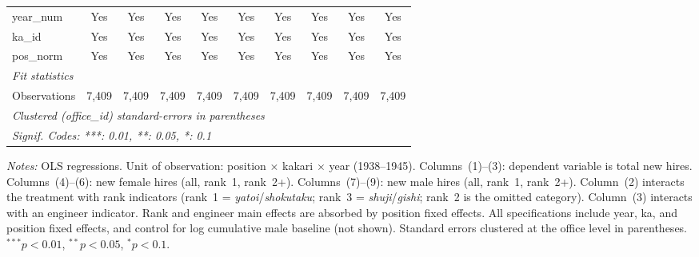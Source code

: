 \begin{table}[htbp]
\begin{threeparttable}
\begin{tabular}{lccccccccc}
   year\_num                      & Yes           & Yes            & Yes            & Yes      & Yes      & Yes           & Yes      & Yes      & Yes\\  
   ka\_id                         & Yes           & Yes            & Yes            & Yes      & Yes      & Yes           & Yes      & Yes      & Yes\\  
   pos\_norm                      & Yes           & Yes            & Yes            & Yes      & Yes      & Yes           & Yes      & Yes      & Yes\\  
   \midrule
   \emph{Fit statistics}\\
   Observations                   & 7,409         & 7,409          & 7,409          & 7,409    & 7,409    & 7,409         & 7,409    & 7,409    & 7,409\\  
   \midrule \midrule
   \multicolumn{10}{l}{\emph{Clustered (office\_id) standard-errors in parentheses}}\\
   \multicolumn{10}{l}{\emph{Signif. Codes: ***: 0.01, **: 0.05, *: 0.1}}\\
\end{tabular}
\begin{tablenotes}[flushleft]
\footnotesize
\item \textit{Notes:} OLS regressions. Unit of observation: position $\times$ kakari $\times$ year (1938--1945). Columns~(1)--(3): dependent variable is total new hires. Columns~(4)--(6): new female hires (all, rank~1, rank~2+). Columns~(7)--(9): new male hires (all, rank~1, rank~2+). Column~(2) interacts the treatment with rank indicators (rank~1 = \emph{yatoi}/\emph{shokutaku}; rank~3 = \emph{shuji}/\emph{gishi}; rank~2 is the omitted category). Column~(3) interacts with an engineer indicator. Rank and engineer main effects are absorbed by position fixed effects. All specifications include year, ka, and position fixed effects, and control for log cumulative male baseline (not shown). Standard errors clustered at the office level in parentheses. $^{***}p<0.01$, $^{**}p<0.05$, $^{*}p<0.1$.
\end{tablenotes}
\end{threeparttable}
\end{table}
